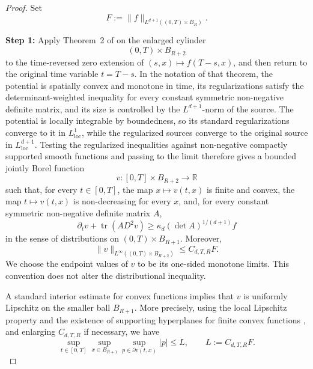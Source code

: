 \documentclass[12pt,oneside, reqno]{amsart}
\numberwithin{equation}{section}
\begin{document}
	\begin{proof}
		Set
		\[
		F:=\|f\|_{L^{d+1}((0,T)\times B_R)}.
		\]
		
	
		\textbf{Step 1:}
		Apply Theorem~2 of \cite{Krylov-1976} on the enlarged cylinder
		\[
		(0,T)\times B_{R+2}
		\]
		to the time-reversed zero extension of
		$(s,x)\mapsto f(T-s,x)$, and then return to the original time variable
		$t=T-s$. In the notation of that theorem, the potential is spatially
		convex and monotone in time, its regularizations satisfy the
		determinant-weighted inequality for every constant symmetric
		non-negative definite matrix, and its size is controlled by the
		$L^{d+1}$-norm of the source. The potential is locally integrable by
		boundedness, so its standard regularizations converge to it in
		$L^1_{\mathrm{loc}}$, while the regularized sources converge to the
		original source in $L^{d+1}_{\mathrm{loc}}$. Testing the regularized
		inequalities against non-negative compactly supported smooth functions
		and passing to the limit therefore gives a bounded jointly Borel function
		\[
		v:[0,T]\times B_{R+2}\longrightarrow\mathbb R
		\]
		such that, for every $t\in[0,T]$, the map $x\mapsto v(t,x)$ is finite
		and convex, the map $t\mapsto v(t,x)$ is non-decreasing for every $x$,
		and, for every constant symmetric non-negative definite matrix $A$,
		\begin{equation}
			\label{eq:appendix-local-distributional-inequality}
			\partial_tv+\operatorname{tr}(A D^2v)
			\geq
			\kappa_d(\det A)^{1/(d+1)}f
		\end{equation}
		in the sense of distributions on
		$(0,T)\times B_{R+1}$. Moreover,
		\begin{equation}
			\label{eq:appendix-local-sup-bound}
			\|v\|_{L^\infty((0,T)\times B_{R+2})}
			\leq
			C_{d,T,R}F.
		\end{equation}
		We choose the endpoint values of $v$ to be its one-sided monotone
		limits. This convention does not alter the distributional inequality.
		
		A standard interior estimate for convex functions implies that $v$
		is uniformly Lipschitz on the smaller ball $B_{R+1}$. More
		precisely, using the local Lipschitz property and the existence of
		supporting hyperplanes for finite convex functions
		\cite[Sections~10 and~23]{Rockafellar-1970}, and enlarging
		$C_{d,T,R}$ if necessary, we have
		\begin{equation}
			\label{eq:appendix-local-subgradient-bound}
			\sup_{t\in[0,T]}
			\sup_{x\in B_{R+1}}
			\sup_{p\in\partial v(t,x)}
			|p|
			\leq L,
			\qquad
			L:=C_{d,T,R}F.
		\end{equation}
		

\end{proof}
\end{document}
